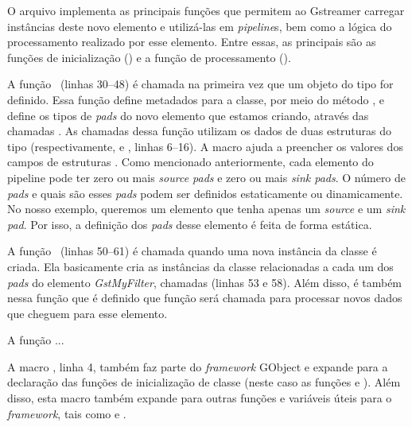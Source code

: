 

O arquivo  implementa as principais funções que permitem ao
Gstreamer carregar instâncias deste novo elemento e utilizá-las em
\emph{pipeline}s, bem como a lógica do processamento realizado por esse
elemento.  Entre essas, as principais são as funções de inicialização
() e a função de processamento ().

A função ~(linhas 30--48) é chamada na primeira vez
que um objeto do tipo  for definido.  Essa função define
metadados para a classe, por meio do método ,
e define os tipos de \emph{pads} do novo elemento que estamos criando, através
das chamadas .  As chamadas dessa função
utilizam os dados de duas estruturas do tipo 
(respectivamente,  e , linhas 6--16).  A macro
 ajuda a preencher os valores dos campos de
estruturas .
Como mencionado anteriormente, cada elemento do pipeline pode ter zero ou mais
\emph{source pads} e zero ou mais \emph{sink pads}.  O número de \emph{pads} e
quais são esses \emph{pads} podem ser definidos estaticamente ou dinamicamente.
No nosso exemplo, queremos um elemento que tenha apenas um \emph{source} e um
\emph{sink pad}.  Por isso, a definição dos \emph{pads} desse elemento é feita
de forma estática.

A função ~(linhas 50--61) é chamada quando uma nova
instância da classe  é criada.  Ela basicamente cria as
instâncias da classe  relacionadas a cada um dos \emph{pads} do
elemento \emph{GstMyFilter}, chamadas 
(linhas 53 e 58).  Além disso, é também nessa função que é definido que  função
 será chamada para processar novos dados que
cheguem para esse elemento.

A função  ...

A macro , linha 4, também faz parte do
\emph{framework} GObject e expande para a declaração das funções de
inicialização de classe (neste caso as funções  e
).  Além disso, esta macro também expande para 
outras funções e variáveis úteis para o \emph{framework}, tais como
 e .


